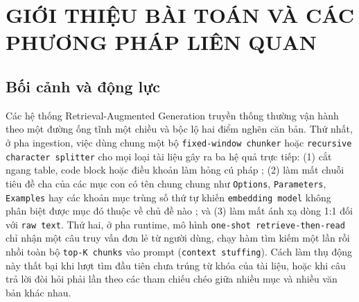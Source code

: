 \section{GIỚI THIỆU BÀI TOÁN VÀ CÁC PHƯƠNG PHÁP LIÊN QUAN}

\subsection{Bối cảnh và động lực}
Các hệ thống Retrieval-Augmented Generation \cite{lewis2020rag} truyền thống thường vận hành theo một đường ống tĩnh một chiều và bộc lộ hai điểm nghẽn căn bản. Thứ nhất, ở pha ingestion, việc dùng chung một bộ \texttt{fixed-window chunker} hoặc \texttt{recursive character splitter} cho mọi loại tài liệu gây ra ba hệ quả trực tiếp: (1) cắt ngang table, code block hoặc điều khoản làm hỏng cú pháp \cite{wang2025coderag, zhang2025cast}; (2) làm mất chuỗi tiêu đề cha của các mục con có tên chung chung như \texttt{Options}, \texttt{Parameters}, \texttt{Examples} hay các khoản mục trùng số thứ tự khiến \texttt{embedding model} không phân biệt được mục đó thuộc về chủ đề nào \cite{anthropic2024contextual}; và (3) làm mất ánh xạ dòng 1:1 đối với \texttt{raw text}. Thứ hai, ở pha runtime, mô hình \texttt{one-shot retrieve-then-read} chỉ nhận một câu truy vấn đơn lẻ từ người dùng, chạy hàm tìm kiếm một lần rồi nhồi toàn bộ \texttt{top-K chunks} vào prompt (\texttt{context stuffing}). Cách làm thụ động này thất bại khi lượt tìm đầu tiên chưa trúng từ khóa của tài liệu, hoặc khi câu trả lời đòi hỏi phải lần theo các tham chiếu chéo giữa nhiều mục và nhiều văn bản khác nhau.

